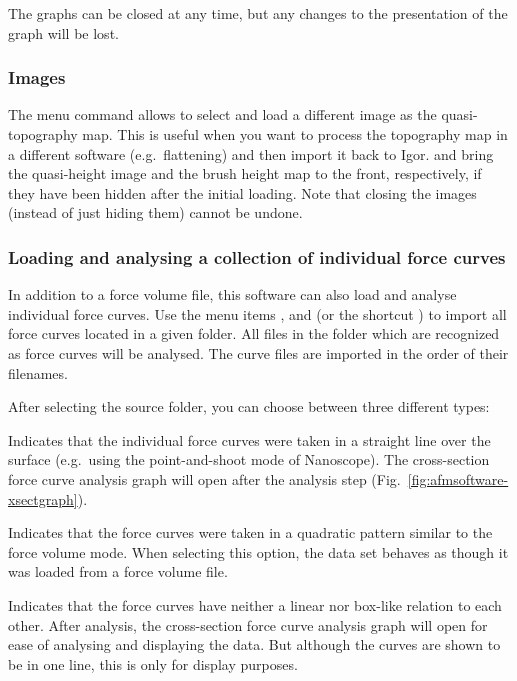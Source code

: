 \documentclass[12pt,a4paper]{article}
\begin{document}
The graphs can be closed at any time, but any changes to the presentation of the graph will be lost.

\subsubsection{Images}
The menu command  allows to select and load a different image as the quasi-topography map. This is useful when you want to process the topography map in a different software (e.g.\ flattening) and then import it back to Igor.
 and  bring the quasi-height image and the brush height map to the front, respectively, if they have been hidden after the initial loading.
Note that closing the images (instead of just hiding them) cannot be undone.

\subsubsection{Loading and analysing a collection of individual force curves}
In addition to a force volume file, this software can also load and analyse individual force curves. Use the menu items ,  and  (or the shortcut ) to import all force curves located in a given folder.
All files in the folder which are recognized as force curves will be analysed. The curve files are imported in the order of their filenames.

After selecting the source folder, you can choose between three different types:

\begin{description}[style=nextline]

\item[line]
Indicates that the individual force curves were taken in a straight line over the surface (e.g.\ using the point-and-shoot mode of Nanoscope).
The cross-section force curve analysis graph will open after the analysis step (Fig.~\ref{fig:afmsoftware-xsectgraph}).

\item[box]
Indicates that the force curves were taken in a quadratic pattern similar to the force volume mode. When selecting this option, the data set behaves as though it was loaded from a force volume file.

\item[random]
Indicates that the force curves have neither a linear nor box-like relation to each other.
After analysis, the cross-section force curve analysis graph will open for ease of analysing and displaying the data. But although the curves are shown to be in one line, this is only for display purposes.

\end{description}
\end{document}
